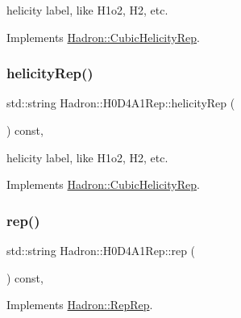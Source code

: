 helicity label, like H1o2, H2, etc. 

Implements \mbox{\hyperlink{structHadron_1_1CubicHelicityRep_af1096946b7470edf0a55451cc662f231}{Hadron\+::\+Cubic\+Helicity\+Rep}}.

\mbox{\label{structHadron_1_1H0D4A1Rep_ae4478095b32b0fd6f52f60f7fd489e6d}} 
\subsubsection{\texorpdfstring{helicityRep()}{helicityRep()}\hspace{0.1cm}{\footnotesize\ttfamily [3/3]}}
{\footnotesize\ttfamily std\+::string Hadron\+::\+H0\+D4\+A1\+Rep\+::helicity\+Rep (\begin{DoxyParamCaption}{ }\end{DoxyParamCaption}) const\hspace{0.3cm}{\ttfamily [inline]}, {\ttfamily [virtual]}}

helicity label, like H1o2, H2, etc. 

Implements \mbox{\hyperlink{structHadron_1_1CubicHelicityRep_af1096946b7470edf0a55451cc662f231}{Hadron\+::\+Cubic\+Helicity\+Rep}}.

\mbox{\label{structHadron_1_1H0D4A1Rep_afbedc9857e7215106a2225ff351ada68}} 
\subsubsection{\texorpdfstring{rep()}{rep()}\hspace{0.1cm}{\footnotesize\ttfamily [1/5]}}
{\footnotesize\ttfamily std\+::string Hadron\+::\+H0\+D4\+A1\+Rep\+::rep (\begin{DoxyParamCaption}{ }\end{DoxyParamCaption}) const\hspace{0.3cm}{\ttfamily [inline]}, {\ttfamily [virtual]}}



Implements \mbox{\hyperlink{structHadron_1_1RepRep_ab3213025f6de249f7095892109575fde}{Hadron\+::\+Rep\+Rep}}.

\mbox{\label{structHadron_1_1H0D4A1Rep_afbedc9857e7215106a2225ff351ada68}} 
